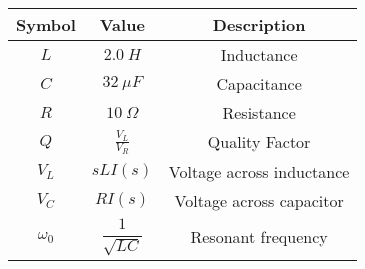 

\begin{tabular}{|c|c|c|}
    \hline
     \textbf{Symbol} & \textbf{Value} &
     \textbf{Description}\\
    \hline
     $L$ &  $2.0\ H$ & Inductance\\[6pt]
    \hline 
     $C$ &  $32\ \mu F$ & Capacitance \\[6pt]
    \hline
     $R$ &  $10\ \Omega$ & Resistance\\[6pt]
    \hline
     $Q$ & $\frac{V_L}{V_R}$ & Quality Factor\\[6pt]
    \hline
    $V_L$ & $sLI(s)$ & Voltage across inductance\\[6pt]
    \hline
    $V_C$ & $RI(s)$ & Voltage across capacitor\\[6pt]
    \hline
    $\omega_0$ & $\dfrac{1}{\sqrt{LC}}$ & Resonant frequency\\[6pt]
    \hline
\end{tabular}
